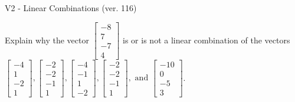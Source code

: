 \begin{exercise}
  \begin{exerciseTitle}V2 - Linear Combinations (ver. 116)\end{exerciseTitle}
  \begin{exerciseStatement}
    Explain why the vector \(\left[\begin{array}{c}
-8 \\
7 \\
-7 \\
4
\end{array}\right]\)  is or is not a linear 
	combination of the vectors \(\left[\begin{array}{c}
-4 \\
1 \\
-2 \\
1
\end{array}\right] , \left[\begin{array}{c}
-2 \\
-2 \\
-1 \\
1
\end{array}\right] , \left[\begin{array}{c}
-4 \\
-1 \\
1 \\
-2
\end{array}\right] , \left[\begin{array}{c}
-2 \\
-2 \\
-1 \\
1
\end{array}\right] , \text{ and } \left[\begin{array}{c}
-10 \\
0 \\
-5 \\
3
\end{array}\right]\).
	



\end{exerciseStatement}
\end{exercise}
